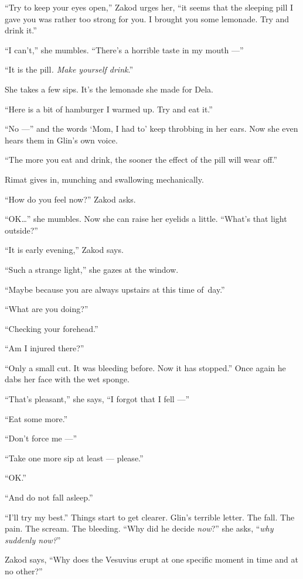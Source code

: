 \documentclass[twoside,11pt,openany]{book}
\begin{document}
``Try to keep your eyes open,'' Zakod urges her, ``it seems that the sleeping pill I gave you was rather too strong
for you. I brought you some lemonade. Try and drink it.''

``I can't,'' she mumbles. ``There's a horrible taste in my mouth ---''

``It is the pill\textit{. Make yourself drink}.{}''

She takes a few sips. It's the lemonade she made for Dela.

``Here is a bit of hamburger I warmed up. Try and eat it.{}''

``No ---'' and the words `Mom, I had to' keep throbbing in her ears. Now she even hears them in Glin's own voice.

``The more you eat and drink, the sooner the effect of the pill will wear off.''

Rimat gives in, munching and swallowing mechanically.

``How do you feel now?'' Zakod asks.

``OK{\ldots}'' she mumbles. Now she can raise her eyelids a little. ``What's that light outside?''

``It is early evening,'' Zakod says.

``Such a strange light,'' she gazes at the window.

``Maybe because you are always upstairs at this time of~day.''

``What are you doing?''

``Checking your forehead.''

``Am I injured there?''

``Only a small cut. It was bleeding before. Now it has stopped.'' Once again he dabs her face with the wet sponge.

``That's pleasant,'' she says, ``I forgot that I fell ---''

``Eat some more.''

``Don't force me ---''

``Take one more sip at least --- please.''

``OK.''

``And do not fall asleep.''

``I'll try my best.'' Things start to get clearer. Glin's terrible letter. The fall. The pain. The scream. The
bleeding. ``Why did he decide \textit{now}?'' she asks, ``\textit{why suddenly now?}{}''

Zakod says, ``Why does the Vesuvius erupt at one specific moment in time and at no other?''
\end{document}
